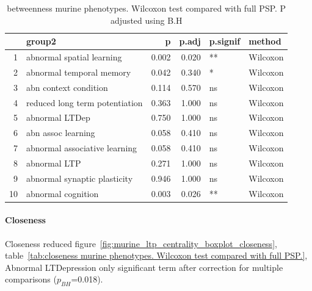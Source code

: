 \begin{table}[ht]
\centering
\begin{tabular}{rlrrll}
  \toprule
 & group2 & p & p.adj & p.signif & method \\ 
  \midrule
1 & abnormal spatial learning & 0.002 & 0.020 & ** & Wilcoxon \\ 
  2 & abnormal temporal memory & 0.042 & 0.340 & * & Wilcoxon \\ 
  3 & abn context condition & 0.114 & 0.570 & ns & Wilcoxon \\ 
  4 & reduced long term potentiation & 0.363 & 1.000 & ns & Wilcoxon \\ 
  5 & abnormal LTDep & 0.750 & 1.000 & ns & Wilcoxon \\ 
  6 & abn assoc learning & 0.058 & 0.410 & ns & Wilcoxon \\ 
  7 & abnormal associative learning & 0.058 & 0.410 & ns & Wilcoxon \\ 
  8 & abnormal LTP & 0.271 & 1.000 & ns & Wilcoxon \\ 
  9 & abnormal synaptic plasticity & 0.946 & 1.000 & ns & Wilcoxon \\ 
  10 & abnormal cognition & 0.003 & 0.026 & ** & Wilcoxon \\ 
   \bottomrule
\end{tabular}
\caption{betweenness murine phenotypes. Wilcoxon test compared with full PSP. P adjusted using B.H} 
\label{tab:betweenness murine phenotypes. Wilcoxon test compared with full PSP. P adjusted using B.H}
\end{table}

\paragraph{Closeness}

Closeness reduced figure~\ref{fig:murine_ltp_centrality_boxplot_closeness}, table~\ref{tab:closeness murine phenotypes. Wilcoxon test compared with full PSP.}, Abnormal LTDepression only significant term after correction for multiple comparisons ($p_{BH}$=0.018).


